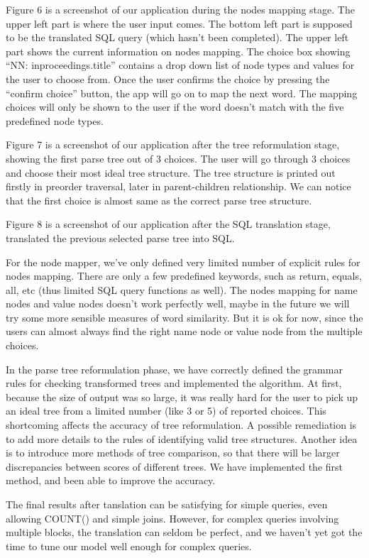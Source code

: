 \documentclass[twocolumn]{article}
\begin{document}
Figure 6 is a screenshot of our application during the nodes mapping stage. The upper left part is where the user input comes. The bottom left part is supposed to be the translated SQL query (which hasn’t been completed). The upper left part shows the current information on nodes mapping. The choice box showing “NN: inproceedings.title” contains a drop down list of node types and values for the user to choose from. Once the user confirms the choice by pressing the “confirm choice” button, the app will go on to map the next word. The mapping choices will only be shown to the user if the word doesn’t match with the five predefined node types.

Figure 7 is a screenshot of our application after the tree reformulation stage, showing the first parse tree out of 3 choices. The user will go through 3 choices and choose their most ideal tree structure. The tree structure is printed out firstly in preorder traversal, later in parent-children relationship. We can notice that the first choice is almost same as the correct parse tree structure.

Figure 8 is a screenshot of our application after the SQL translation stage, translated the previous selected parse tree into SQL.

For the node mapper, we’ve only defined very limited number of explicit rules for nodes mapping. There are only a few predefined keywords, such as return, equals, all, etc (thus limited SQL query functions as well). The nodes mapping for name nodes and value nodes doesn’t work perfectly well, maybe in the future we will try some more sensible measures of word similarity. But it is ok for now, since the users can almost always find the right name node or value node from the multiple choices. 

In the parse tree reformulation phase, we have correctly defined the grammar rules for checking transformed trees and implemented the algorithm. At first, because the size of output was so large, it was really hard for the user to pick up an ideal tree from a limited number (like 3 or 5) of reported choices. This shortcoming affects the accuracy of tree reformulation. A possible remediation is to add more details to the rules of identifying valid tree structures. Another idea is to introduce more methods of tree comparison, so that there will be larger discrepancies between scores of different trees. We have implemented the first method, and been able to improve the accuracy.

The final results after tanslation can be satisfying for simple queries, even allowing COUNT() and simple joins. However, for complex queries involving multiple blocks, the translation can seldom be perfect, and we haven't yet got the time to tune our model well enough for complex queries.
\end{document}
